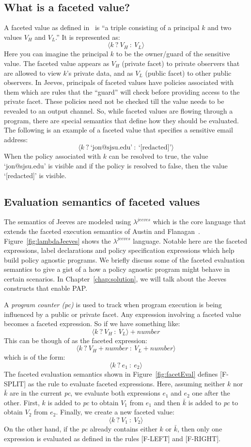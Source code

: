 \subsection{What is a faceted value?}
A faceted value as defined in~\cite{Faceted} is ``a triple consisting of a principal
$k$ and two values $V_H$ and $V_L$.'' It is represented as:
\[\langle k~?~V_H~:~V_L \rangle\]
Here you can imagine the principal $k$ to be the owner/guard of the sensitive value.
The faceted value appears as $V_H$ (private facet) to private observers that are
allowed to view $k$'s private data, and as $V_L$ (public facet) to other public
observers. In Jeeves, principals of faceted values have policies associated with
them which are rules that the ``guard'' will check before providing access to the
private facet. These policies need not be checked till the value needs to be revealed
to an output channel. So, while faceted values are flowing through a program, there
are special semantics that define how they should be evaluated. The following is
an example of a faceted value that specifies a sensitive email address:
\[\langle k~?~\text{`jon@sjsu.edu'}~:~\text{`[redacted]'} \rangle\]
When the policy associated with $k$ can be resolved to true, the value `jon@sjsu.edu'
is visible and if the policy is resolved to false, then the value `[redacted]' is
visible.

\subsection{Evaluation semantics of faceted values \label{sec:facetEval}}
The semantics of Jeeves are modeled using $\lambda^{jeeves}$ which is the core
language that extends the faceted execution semantics of Austin and Flanagan~\cite{Faceted}.
Figure~\ref{fig:lambdaJeeves} shows the $\lambda^{jeeves}$ language. Notable here
are the faceted expressions, label declarations and policy specification expressions
which help build policy agnostic programs. We briefly discuss some of the faceted
evaluation semantics to give a gist of a how a policy agnostic program might behave
in certain scenarios. In Chapter~\ref{chap:solution}, we will talk about the Jeeves
constructs that enable PAP.

A \textit{program counter (pc)} is used to track when program execution is being
influenced by a public or private facet. Any expression involving a faceted value
becomes a faceted expression. So if we have something like:
\[\langle k~?~V_H~:~V_L \rangle + number \]
This can be though of as the faceted expression:
\[\langle k~?~V_H + number~:~V_L + number \rangle\]
which is of the form:
\[\langle k~?~e_1~:~e_2 \rangle\]
The faceted evaluation semantics shown in Figure~\ref{fig:facetEval} defines [F-SPLIT]
as the rule to evaluate faceted expressions. Here, assuming neither $k$ nor $\bar{k}$
are in the current \textit{pc}, we evaluate both expressions $e_1$ and $e_2$
one after the other. First, $k$ is added to \textit{pc} to obtain $V_1$ from $e_1$
and then $\bar{k}$ is added to \textit{pc} to obtain $V_2$ from $e_2$. Finally,
we create a new faceted value:
\[\langle k~?~V_1~:~V_2 \rangle\]
On the other hand, if the \textit{pc} already contains either $k$ or $\bar{k}$,
then only one expression is evaluated as defined in the rules [F-LEFT] and [F-RIGHT].

